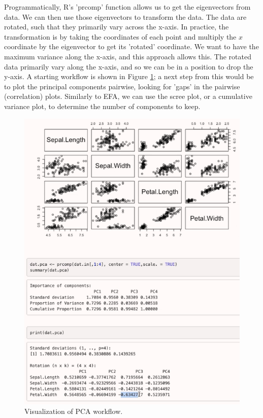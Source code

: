 \documentclass[11pt]{article}
\begin{document}
Programmatically, R's 'prcomp' function allows us to get the eigenvectors from data.
We can then use those eigenvectors to transform the data.
The data are rotated, such that they primarily vary across the x-axis.
In practice, the transformation is by taking the coordinates of each point and multiply the $x$ coordinate by the eigenvector to get its 'rotated' coordinate.
We want to have the maximum variance along the x-axis, and this approach allows this.
The rotated data primarily vary along the x-axis, and so we can be in a position to drop the y-axis.
A starting workflow is shown in Figure \ref{fig:PCA_Image1}; a next step from this would be to plot the principal components pairwise, looking for 'gaps' in the pairwise (correlation) plots.
Similarly to EFA, we can use the scree plot, or a cumulative variance plot, to determine the number of components to keep.

\begin{figure}[htbp]
    \centering
    \caption{Visualization of PCA workflow.}
    \label{fig:PCA_Image1}
    \includegraphics[width=\textwidth]{Images/PCA_Image1.png}
\end{figure}
\end{document}
